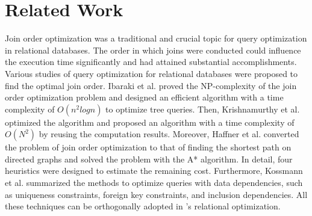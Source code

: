 \section{Related Work}
\label{sec:related-work}


 Join order optimization was a traditional and crucial topic for query optimization in relational databases. The order in which joins were conducted could influence the execution time significantly and had attained substantial accomplishments. Various studies of query optimization for relational databases were proposed to find the optimal join order.
Ibaraki et al.\cite{nested-tods-1984} proved the NP-complexity of the join order optimization problem and designed an efficient algorithm with a time complexity of $O(n^2logn)$ to optimize tree queries.
Then, Krishnamurthy et al.\cite{optimize-nested-vldb-1986} optimized the algorithm and proposed an algorithm with a time complexity of $O(N^2)$ by reusing the computation results.
Moreover, Haffner et al.\cite{astarjoin} converted the problem of join order optimization to that of finding the shortest path on directed graphs and solved the problem with the A* algorithm. In detail, four heuristics were designed to estimate the remaining cost. Furthermore, Kossmann et al.\cite{data-dependency-join} summarized the methods to optimize queries with data dependencies, such as uniqueness constraints, foreign key constraints, and inclusion dependencies.
All these techniques can be orthogonally adopted in \name's relational optimization.

